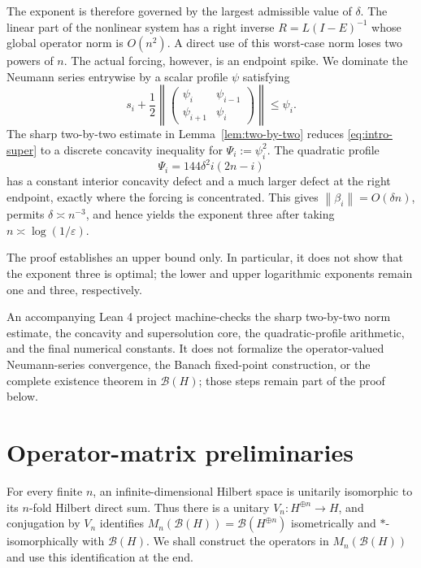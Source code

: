 \documentclass[11pt]{amsart}
\numberwithin{equation}{section}
\theoremstyle{remark}
\newcommand{\norm}[1]{\left\lVert #1\right\rVert}
\begin{document}
The exponent is therefore governed by the largest admissible value of
$\delta$.  The linear part of the nonlinear system has a right inverse
$R=L(I-E)^{-1}$ whose global operator norm is $O(n^2)$.  A direct use of this
worst-case norm loses two powers of $n$.  The actual forcing, however, is an
endpoint spike.  We dominate the Neumann series entrywise by a scalar profile
$\psi$ satisfying
\begin{equation}\label{eq:intro-super}
 s_i+\frac12\norm{
 \begin{pmatrix}
 \psi_i&\psi_{i-1}\\
 \psi_{i+1}&\psi_i
 \end{pmatrix}}
 \leq\psi_i.
\end{equation}
The sharp two-by-two estimate in Lemma~\ref{lem:two-by-two} reduces
\eqref{eq:intro-super} to a discrete concavity inequality for
$\Psi_i:=\psi_i^2$.  The quadratic profile
\begin{equation}\label{eq:intro-profile}
 \Psi_i=144\delta^2 i(2n-i)
\end{equation}
has a constant interior concavity defect and a much larger defect at the right
endpoint, exactly where the forcing is concentrated.  This gives
$\norm{\beta_i}=O(\delta n)$, permits $\delta\asymp n^{-3}$, and hence yields
the exponent three after taking $n\asymp\log(1/\varepsilon)$.

The proof establishes an upper bound only.  In particular, it does not show
that the exponent three is optimal; the lower and upper logarithmic exponents
remain one and three, respectively.

An accompanying Lean 4 project machine-checks the sharp two-by-two norm
estimate, the concavity and supersolution core, the quadratic-profile
arithmetic, and the final numerical constants.  It does not formalize the
operator-valued Neumann-series convergence, the Banach fixed-point
construction, or the complete existence theorem in $\mathcal B(H)$; those
steps remain part of the proof below.

\section{Operator-matrix preliminaries}

For every finite $n$, an infinite-dimensional Hilbert space is unitarily
isomorphic to its $n$-fold Hilbert direct sum.  Thus there is a unitary
$V_n:H^{\oplus n}\to H$, and conjugation by $V_n$ identifies
$M_n(\mathcal B(H))=\mathcal B(H^{\oplus n})$ isometrically and
$*$-isomorphically with $\mathcal B(H)$.  We shall construct the operators in
$M_n(\mathcal B(H))$ and use this identification at the end.
\end{document}
